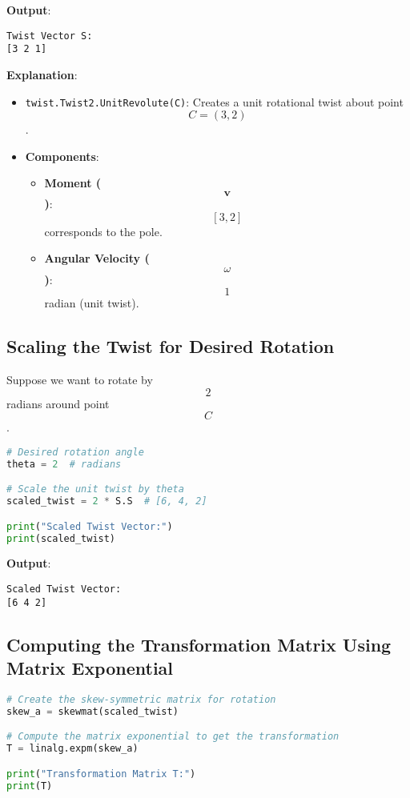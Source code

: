 \documentclass[12pt]{article}
\begin{document}
\textbf{Output}:
\begin{verbatim}
Twist Vector S:
[3 2 1]
\end{verbatim}

\textbf{Explanation}:
\begin{itemize}
    \item \texttt{twist.Twist2.UnitRevolute(C)}: Creates a unit rotational twist about point $$ C = (3, 2) $$.
    \item \textbf{Components}:
        \begin{itemize}
            \item \textbf{Moment ($$ \mathbf{v} $$)}: $$ [3, 2] $$ corresponds to the pole.
            \item \textbf{Angular Velocity ($$ \omega $$)}: $$ 1 $$ radian (unit twist).
        \end{itemize}
\end{itemize}

\subsection{Scaling the Twist for Desired Rotation}

Suppose we want to rotate by $$ 2 $$ radians around point $$ C $$.

\begin{lstlisting}[language=Python]
# Desired rotation angle
theta = 2  # radians

# Scale the unit twist by theta
scaled_twist = 2 * S.S  # [6, 4, 2]

print("Scaled Twist Vector:")
print(scaled_twist)
\end{lstlisting}

\textbf{Output}:
\begin{verbatim}
Scaled Twist Vector:
[6 4 2]
\end{verbatim}

\subsection{Computing the Transformation Matrix Using Matrix Exponential}

\begin{lstlisting}[language=Python]
# Create the skew-symmetric matrix for rotation
skew_a = skewmat(scaled_twist)

# Compute the matrix exponential to get the transformation
T = linalg.expm(skew_a)

print("Transformation Matrix T:")
print(T)
\end{lstlisting}
\end{document}
